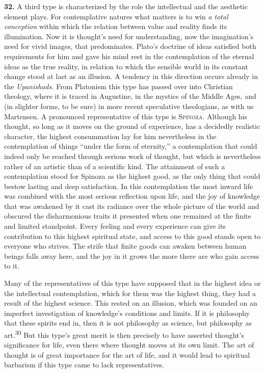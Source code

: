 \documentclass[12pt,a4paper]{book}
\newcommand{\opage}[1]{\marginnote{\footnotesize\textit{[#1]}}}
\begin{document}
\noindent\textbf{32.} A third type is characterized by the role the
intellectual and the aesthetic element plays. For contemplative natures what
matters is to win \emph{a total conception} within which the relation between
value and reality finds its illumination. Now it is thought's need for
understanding, now the imagination's need for vivid images, that predominates.
Plato's doctrine of ideas satisfied both requirements for him and gave his mind
rest in the contemplation of the eternal ideas as the true reality, in relation
to which the sensible world in its constant change stood at last as an illusion.
A tendency in this direction occurs already in the \emph{Upanishads.} From
Platonism this type has passed over into Christian theology, where it is traced
in Augustine, in the mystics of the Middle Ages, and (in slighter forms, to be
sure) in more recent speculative theologians, as with us Martensen. A pronounced
representative of this type is \textsc{Spinoza}. Although his thought, so long as
it moves on the ground of experience, has a decidedly realistic character, the
highest consummation lay for him nevertheless in the contemplation of things
``under the form of eternity,'' a contemplation that could indeed 
\opage{76}only be reached
through serious work of thought, but which is nevertheless rather of an artistic
than of a scientific kind. The attainment of such a contemplation stood for
Spinoza as the highest good, as the only thing that could bestow lasting and deep
satisfaction. In this contemplation the most inward life was combined with the
most serious reflection upon life, and the joy of knowledge that was awakened by
it cast its radiance over the whole picture of the world and obscured the
disharmonious traits it presented when one remained at the finite and limited
standpoint. Every feeling and every experience can give its contribution to this
highest spiritual state, and access to this good stands open to everyone who
strives. The strife that finite goods can awaken between human beings falls away
here, and the joy in it grows the more there are who gain access to it.

Many of the representatives of this type have supposed that in the highest idea
or the intellectual contemplation, which for them was the highest thing, they had
a result of the highest science. This rested on an illusion, which was founded on
an imperfect investigation of knowledge's conditions and limits. If it is
philosophy that these spirits end in, then it is not philosophy as science, but
philosophy as art.\textsuperscript{30} But this type's great merit is then
precisely to have asserted thought's significance for life, even there where
thought moves at its own limit. The art of thought is of great importance for the
art of life, and it would lead to spiritual barbarism if this type came to lack
representatives.
\end{document}
